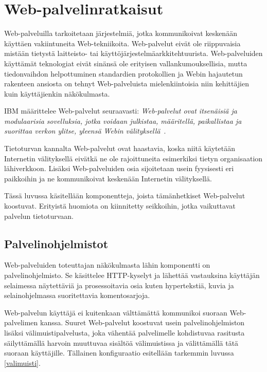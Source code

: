 
\chapter{Web-palvelinratkaisut}

Web-palveluilla tarkoitetaan järjestelmiä, jotka kommunikoivat
keskenään käyttäen vakiintuneita Web-tekniikoita. Web-palvelut eivät
ole riippuvaisia mistään tietystä laitteisto- tai
käyttöjärjestelmäarkkitehtuurista. Web-palveluiden käyttämät
teknologiat eivät sinänsä ole erityisen vallankumouksellisia, mutta
tiedonvaihdon helpottuminen standardien protokollien ja Webin
hajautetun rakenteen ansiosta on tehnyt Web-palveluista
mielenkiintoisia niin kehittäjien kuin käyttäjienkin
näkökulmasta\cite{javaweb}.

IBM määrittelee Web-palvelut seuraavasti: \textit{Web-palvelut ovat
itsenäisiä ja modulaarisia sovelluksia, jotka voidaan julkistaa,
määritellä, paikallistaa ja suorittaa verkon ylitse, yleensä Webin
välityksellä}~\cite{websecurity}.

Tietoturvan kannalta Web-palvelut ovat haastavia, koska niitä
käytetään Internetin välityksellä eivätkä ne ole rajoittuneita
esimerkiksi tietyn organisaation lähiverkkoon.
Lisäksi Web-palveluiden osia sijoitetaan usein fyysisesti eri paikkoihin ja ne
kommunikoivat keskenään Internetin välityksellä.

Tässä luvussa käsitellään komponentteja, joista tämänhetkiset
Web-palvelut koostuvat. Erityistä huomiota on kiinnitetty seikkoihin,
jotka vaikuttavat palvelun tietoturvaan.

\section{Palvelinohjelmistot}

Web-palveluiden toteuttajan näkökulmasta lähin komponentti on
palvelinohjelmisto. Se käsittelee HTTP-kyselyt ja lähettää vastauksina
käyttäjän selaimessa näytettäviä ja prosessoitavia osia kuten
hypertekstiä, kuvia ja selainohjelmassa suoritettavia komentosarjoja.

Web-palvelun käyttäjä ei kuitenkaan välttämättä kommunikoi suoraan
Web-pal\-ve\-li\-men kanssa. Suuret Web-palvelut koostuvat usein
palvelinohjelmiston lisäksi välimuistipalvelusta, joka vähentää
palvelimelle kohdistuvaa rasitusta säilyttämällä harvoin muuttuvaa
sisältöä välimuistissa ja välittämällä tätä suoraan
käyttäjille. Tällainen konfiguraatio esitellään tarkemmin luvussa \ref{valimuisti}.

